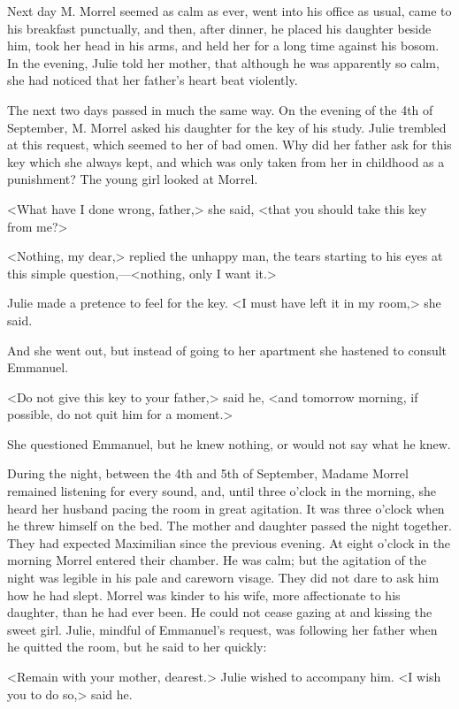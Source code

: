  Next day M. Morrel seemed as calm as ever, went into his office as usual, came to his breakfast punctually, and then, after dinner, he placed his daughter beside him, took her head in his arms, and held her for a long time against his bosom. In the evening, Julie told her mother, that although he was apparently so calm, she had noticed that her father's heart beat violently. 

 The next two days passed in much the same way. On the evening of the 4th of September, M. Morrel asked his daughter for the key of his study. Julie trembled at this request, which seemed to her of bad omen. Why did her father ask for this key which she always kept, and which was only taken from her in childhood as a punishment? The young girl looked at Morrel. 

 <What have I done wrong, father,> she said, <that you should take this key from me?> 

 <Nothing, my dear,> replied the unhappy man, the tears starting to his eyes at this simple question,—<nothing, only I want it.> 

 Julie made a pretence to feel for the key. <I must have left it in my room,> she said. 

 And she went out, but instead of going to her apartment she hastened to consult Emmanuel. 

 <Do not give this key to your father,> said he, <and tomorrow morning, if possible, do not quit him for a moment.> 

 She questioned Emmanuel, but he knew nothing, or would not say what he knew. 

 During the night, between the 4th and 5th of September, Madame Morrel remained listening for every sound, and, until three o'clock in the morning, she heard her husband pacing the room in great agitation. It was three o'clock when he threw himself on the bed. The mother and daughter passed the night together. They had expected Maximilian since the previous evening. At eight o'clock in the morning Morrel entered their chamber. He was calm; but the agitation of the night was legible in his pale and careworn visage. They did not dare to ask him how he had slept. Morrel was kinder to his wife, more affectionate to his daughter, than he had ever been. He could not cease gazing at and kissing the sweet girl. Julie, mindful of Emmanuel's request, was following her father when he quitted the room, but he said to her quickly: 

 <Remain with your mother, dearest.> Julie wished to accompany him. <I wish you to do so,> said he. 


